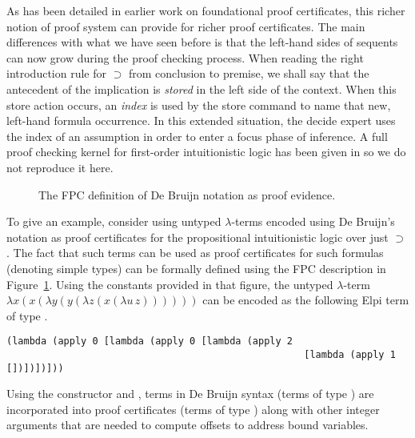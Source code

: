 As has been detailed in earlier work on foundational proof
certificates, this richer notion of proof system can provide for
richer proof certificates.  The main differences with what we have
seen before is that the left-hand sides of sequents can now grow
during the proof checking process.  When reading the right
introduction rule for $\supset$ from conclusion to premise, we shall
say that the antecedent of the implication is \emph{stored} in the
left side of the context.  When this store action occurs, an
\emph{index} is used by the store command to name that new, left-hand
formula occurrence.  In this extended situation, the decide expert
uses the index of an assumption in order to enter a focus phase of
inference.  A full proof checking kernel for first-order
intuitionistic logic has been given in \cite{chihani17jar} so we do
not reproduce it here.

\begin{figure}


\caption{The FPC definition of De Bruijn notation as proof evidence.}
\label{fig:debruijn}
\end{figure}

To give an example, consider using untyped $\lambda$-terms encoded
using De Bruijn's notation as proof certificates for the propositional
intuitionistic logic over just $\supset$.  The fact that such terms
can be used as proof certificates for such formulas (denoting simple
types) can be formally defined using the FPC description in
Figure~\ref{fig:debruijn}.
%
Using the constants provided in that figure, the untyped
$\lambda$-term $\lambda x (x (\lambda y (y (\lambda z (x (\lambda
u\,z))))))$ can be encoded as the following Elpi term of type
.
%
\begin{lstlisting}[basicstyle=\ttfamily,language=lprolog]
(lambda (apply 0 [lambda (apply 0 [lambda (apply 2 
                                                    [lambda (apply 1 [])])])]))
\end{lstlisting}
Using the constructor  and , terms in De Bruijn
syntax (terms of type ) are incorporated into proof
certificates (terms of type ) along with other integer
arguments that are needed to compute offsets to address bound
variables.  

